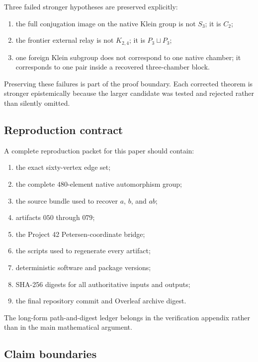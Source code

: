 Three failed stronger hypotheses are preserved explicitly:

\begin{enumerate}
    \item the full conjugation image on the native Klein group is not
    \(S_3\); it is \(C_2\);

    \item the frontier external relay is not \(K_{2,4}\); it is
    \(P_3\sqcup P_3\);

    \item one foreign Klein subgroup does not correspond to one native
    chamber; it corresponds to one pair inside a recovered
    three-chamber block.
\end{enumerate}

Preserving these failures is part of the proof boundary. Each corrected
theorem is stronger epistemically because the larger candidate was
tested and rejected rather than silently omitted.

\subsection{Reproduction contract}

A complete reproduction packet for this paper should contain:

\begin{enumerate}
    \item the exact sixty-vertex edge set;
    \item the complete \(480\)-element native automorphism group;
    \item the source bundle used to recover \(a\), \(b\), and \(ab\);
    \item artifacts \(050\) through \(079\);
    \item the Project 42 Petersen-coordinate bridge;
    \item the scripts used to regenerate every artifact;
    \item deterministic software and package versions;
    \item SHA-256 digests for all authoritative inputs and outputs;
    \item the final repository commit and Overleaf archive digest.
\end{enumerate}

The long-form path-and-digest ledger belongs in the verification
appendix rather than in the main mathematical argument.

\subsection{Claim boundaries}

